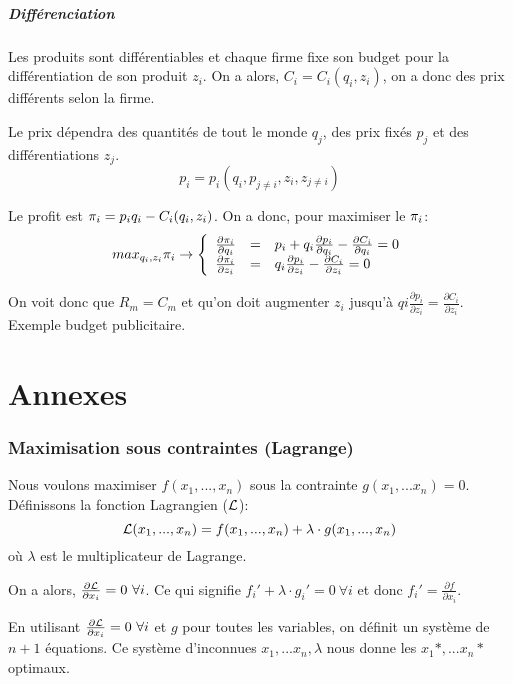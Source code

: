 \subsubsection{Différenciation}
Les produits sont différentiables et chaque firme fixe son budget
pour la différentiation de son produit $z_i$.
On a alors, $C_i = C_i(q_i, z_i)$, on a donc des prix différents selon la firme.

Le prix dépendra des quantités de tout le monde $q_j$,
des prix fixés $p_j$ et des différentiations $z_j$.
$$p_i = p_i(q_i, p_{j\neq i}, z_i, z_{j \neq i})$$

Le profit est $\pi_i = p_iq_i - C_i(q_i, z_i)$.
On a donc, pour maximiser le $\pi_i$:
\begin{equation}
max_{q_i, z_i} \pi_i \rightarrow 
\left\lbrace
\begin{array}{lcl}
\frac{\partial \pi_i}{\partial q_i} &=& 
p_i + q_i\frac{\partial p_i}{\partial q_i} - \frac{\partial C_i}{\partial q_i} = 0\\
\frac{\partial \pi_i}{\partial z_i} &=&
q_i\frac{\partial p_i}{\partial z_i} - \frac{\partial C_i}{\partial z_i} = 0
\end{array}
\right.
\end{equation}

On voit donc que $R_m = C_m$ et qu'on doit augmenter $z_i$ jusqu'à
$qi\frac{\partial p_i}{\partial z_i} = \frac{\partial C_i}{\partial z_i}$.
Exemple budget publicitaire.


\part{Annexes}
\appendix
\section{Maximisation sous contraintes (Lagrange)}
Nous voulons maximiser $f(x_1,..., x_n)$ sous la contrainte $g(x_1,...x_n) = 0$.
Définissons la fonction Lagrangien ($\mathcal{L}$):
$$\mathcal{L}(x_1,..., x_n) = f(x_1,..., x_n) + \lambda\cdot g(x_1,..., x_n)$$
où $\lambda$ est le multiplicateur de Lagrange.

On a alors, $\frac{\partial \mathcal{L}}{\partial x_i} = 0\ \forall i$. Ce qui signifie
$f_i' + \lambda\cdot g_i' = 0\ \forall i$ et donc
$f_i' = \frac{\partial f}{\partial x_i}$.

En utilisant $\frac{\partial \mathcal{L}}{\partial x_i} = 0\ \forall i$ et $g$ pour
toutes les variables, on définit un système de $n+1$ équations. Ce système
d'inconnues $x_1,...x_n, \lambda$ nous donne les $x_1*,...x_n*$ optimaux.

